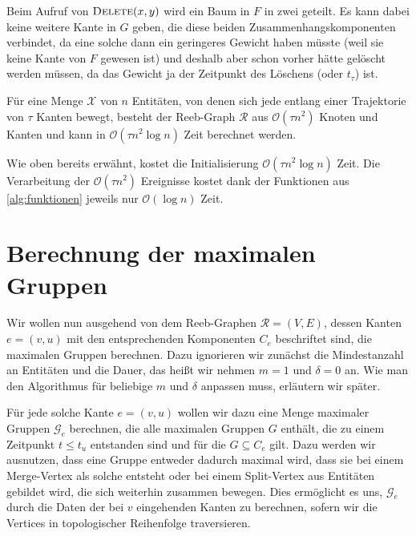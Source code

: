 Beim Aufruf von $\textsc{Delete}(x,y)$ wird ein Baum in $F$ in zwei geteilt.
Es kann dabei keine weitere Kante in $G$ geben, die diese beiden Zusammenhangskomponenten verbindet, da eine solche dann ein geringeres Gewicht haben müsste (weil sie keine Kante von $F$ gewesen ist) und deshalb aber schon vorher hätte gelöscht werden müssen, da das Gewicht ja der Zeitpunkt des Löschens (oder $t_\tau$) ist.

\begin{satz}[{name={\cite[Thm.~7]{buchin2015}}}]
	Für eine Menge $\mathcal{X}$ von $n$ Entitäten, von denen sich jede entlang einer Trajektorie von $\tau$ Kanten bewegt, besteht der Reeb-Graph $\mathcal{R}$ aus $\mathcal{O}(\tau n^2)$ Knoten und Kanten und kann in $\mathcal{O}(\tau n^2 \log n)$ Zeit berechnet werden.
\end{satz}
\begin{beweis}
	Wie oben bereits erwähnt, kostet die Initialisierung $\mathcal{O}(\tau n^2 \log n)$ Zeit.
	Die Verarbeitung der $\mathcal{O}(\tau n^2)$ Ereignisse kostet dank der Funktionen aus \cref{alg:funktionen} jeweils nur $\mathcal{O}(\log n)$ Zeit.
\end{beweis}

\section{Berechnung der maximalen Gruppen} %
\label{sec:berechnung_maximale_gruppen}
Wir wollen nun ausgehend von dem Reeb-Graphen $\mathcal{R}=(V,E)$, dessen Kanten $e=(v,u)$ mit den entsprechenden Komponenten $C_e$ beschriftet sind, die maximalen Gruppen berechnen.
Dazu ignorieren wir zunächst die Mindestanzahl an Entitäten und die Dauer, das heißt wir nehmen $m=1$ und $\delta=0$ an.
Wie man den Algorithmus für beliebige $m$ und $\delta$ anpassen muss, erläutern wir später.

Für jede solche Kante $e=(v,u)$ wollen wir dazu eine Menge maximaler Gruppen $\mathcal{G}_e$ berechnen, die alle maximalen Gruppen $G$ enthält, die zu einem Zeitpunkt $t \le t_u$ entstanden sind und für die $G \subseteq C_e$ gilt.
Dazu werden wir ausnutzen, dass eine Gruppe entweder dadurch maximal wird, dass sie bei einem Merge-Vertex als solche entsteht oder bei einem Split-Vertex aus Entitäten gebildet wird, die sich weiterhin zusammen bewegen.
Dies ermöglicht es uns, $\mathcal{G}_e$ durch die Daten der bei $v$ eingehenden Kanten zu berechnen, sofern wir die Vertices in topologischer Reihenfolge traversieren.

